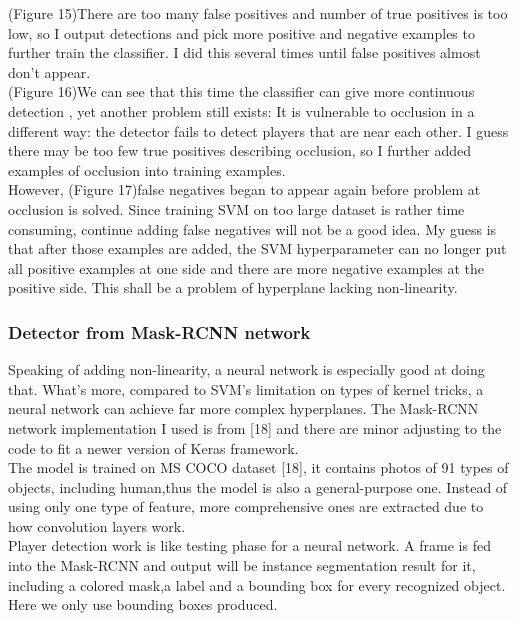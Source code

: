 \documentclass{article}
\begin{document}
(Figure 15)There are too many false positives and number of true positives is too low, so I output detections and pick more positive and negative examples to further train the classifier. I did this several times until false positives almost don’t appear.\\
(Figure 16)We can see that this time the classifier can give more continuous detection , yet another problem still exists: It is vulnerable to occlusion in a different way: the detector fails to detect players that are near each other. I guess there may be too few true positives describing occlusion, so I further added examples of occlusion into training examples.\\
However, (Figure 17)false negatives began to appear again before problem at occlusion is solved. Since training SVM on too large dataset is rather time consuming, continue adding false negatives will not be a good idea.
My guess is that after those examples are added, the SVM hyperparameter can no longer put all positive examples at one side and there are more negative examples at the positive side. This shall be a problem of hyperplane lacking non-linearity.
\subsubsection{Detector from Mask-RCNN network}
Speaking of adding non-linearity, a neural network is especially good at doing that. What’s more, compared to SVM’s limitation on types of kernel tricks, a neural network can achieve far more complex hyperplanes. The Mask-RCNN network implementation I used is from [18] and there are minor adjusting to the code to fit a newer version of Keras framework.\\
The model is trained on MS COCO dataset [18], it contains photos of 91 types of objects, including human,thus the model is also a general-purpose one. Instead of using only one type of feature, more comprehensive ones are extracted due to how convolution layers work.\\
Player detection work is like testing phase for a neural network. A frame is fed into the Mask-RCNN and output will be instance segmentation result for it, including a colored mask,a label and a bounding box for every recognized object. Here we only use bounding boxes produced.
\end{document}
